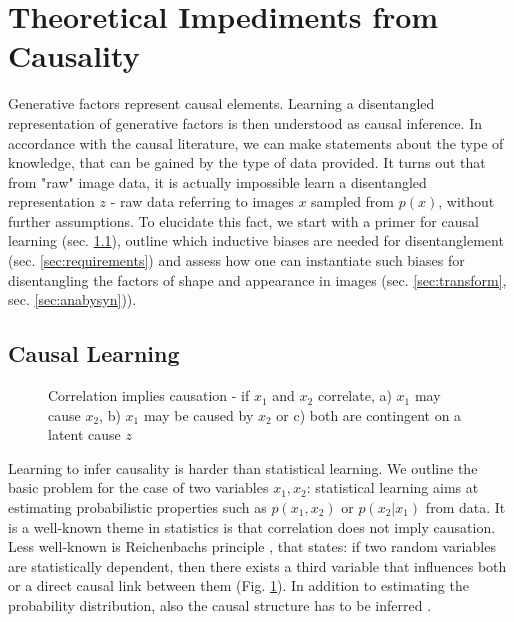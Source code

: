 \section{Theoretical Impediments from Causality}\label{sec:causality}
	Generative factors represent causal elements.
	Learning a disentangled representation of generative factors is then understood as causal inference.
	In accordance with the causal literature, we can make statements about the type of knowledge, that can be gained by the type of data provided. It turns out that from "raw" image data, it is actually impossible learn a disentangled representation $z$ - raw data referring to images $x$ sampled from $p(x)$, without further assumptions.
	To elucidate this fact, we start with a primer for causal learning (sec. \ref{sec:causallearning}), outline which inductive biases are needed for disentanglement (sec. \ref{sec:requirements}) and assess how one can instantiate such biases for disentangling the factors of shape and appearance in images (sec. \ref{sec:transform}, sec. \ref{sec:anabysyn})).

	\subsection{Causal Learning}\label{sec:causallearning}
		\begin{figure}[t]
			\begin{subfigure}{0.3\linewidth}
				\centering
				
				\caption{}
			\end{subfigure}
			\begin{subfigure}{0.3\linewidth}
				\centering
				
				\caption{}
			\end{subfigure}
			\begin{subfigure}{0.3\linewidth}
				\centering
				
				\caption{}
			\end{subfigure}
			\caption{Correlation implies causation - if $x_1$ and $x_2$ correlate, a) $x_1$ may cause $x_2$,  b) $x_1$ may be caused by $x_2$ or c) both are contingent on a latent cause $z$}
			\label{fig:reichenbach}
		\end{figure}

		Learning to infer causality is harder than statistical learning. We outline the basic problem for the case of two variables $x_1, x_2$: statistical learning aims at estimating probabilistic properties such as $p(x_1, x_2)$ or  $p(x_2|x_1)$ from data.
		It is a well-known theme in statistics is that correlation does not imply causation. Less well-known is Reichenbachs principle \cite{peters17elements, reichenbach56time}, that states: if two random variables are statistically dependent, then there exists a third variable that influences both or a direct causal link between them (Fig. \ref{fig:reichenbach}).
		In addition to estimating the probability distribution, also the causal structure has to be inferred \cite{peters17elements}.

